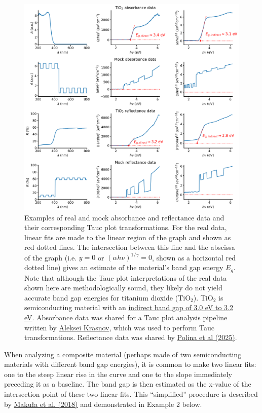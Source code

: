 \documentclass[letterpaper, 12pt]{article}
\begin{document}
\pagebreak
\begin{figure}[h!tbp]
    \centering
    \includegraphics[width=\textwidth]{img/tauc/250320_tauc_demo.png}
    \caption*{Examples of real and mock absorbance and reflectance data and their corresponding Tauc plot transformations. For the real data, linear fits are made to the linear region of the graph and shown as red dotted lines. The intersection between this line and the abscissa of the graph (i.e. $y = 0$ or $(\alpha h \nu)^{1/\gamma} = 0$, shown as a horizontal red dotted line) gives an estimate of the material's band gap energy $E_g$. Note that although the Tauc plot interpretations of the real data shown here are methodologically sound, they likely do not yield accurate band gap energies for titanium dioxide (TiO$_2$). TiO$_2$ is semiconducting material with an \href{https://doi.org/10.1038/srep04043}{indirect band gap of 3.0 eV to 3.2 eV}. Absorbance data was shared for a Tauc plot analysis pipeline written by   \href{https://github.com/alexey-krasnov/absorption_tauc_plot}{Aleksei Krasnov}, which was used to perform Tauc transformations. Reflectance data was shared by \href{https://doi.org/10.5281/zenodo.14608640}{Polina et al (2025)}.}
\end{figure}

When analyzing a composite material (perhaps made of two semiconducting materials with different band gap energies), it is common to make two linear fits: one to the steep linear rise in the curve and one to the slope immediately preceding it as a baseline. The band gap is then estimated as the x-value of the intersection point of these two linear fits. This ``simplified'' procedure is described by \href{https://doi.org/10.1021/acs.jpclett.8b02892}{Maku\l{}a et al. (2018)} and demonstrated in Example 2 below.
\end{document}
